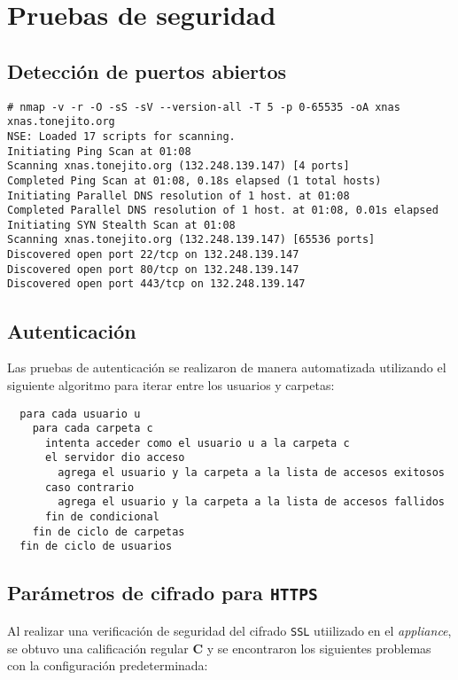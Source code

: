     \section {Pruebas de seguridad}

      \subsection {Detecci\'{o}n de puertos abiertos}

{
\scriptsize
\linespread{1}
\begin{verbatim}
# nmap -v -r -O -sS -sV --version-all -T 5 -p 0-65535 -oA xnas xnas.tonejito.org
NSE: Loaded 17 scripts for scanning.
Initiating Ping Scan at 01:08
Scanning xnas.tonejito.org (132.248.139.147) [4 ports]
Completed Ping Scan at 01:08, 0.18s elapsed (1 total hosts)
Initiating Parallel DNS resolution of 1 host. at 01:08
Completed Parallel DNS resolution of 1 host. at 01:08, 0.01s elapsed
Initiating SYN Stealth Scan at 01:08
Scanning xnas.tonejito.org (132.248.139.147) [65536 ports]
Discovered open port 22/tcp on 132.248.139.147
Discovered open port 80/tcp on 132.248.139.147
Discovered open port 443/tcp on 132.248.139.147
\end{verbatim}
}


      \subsection {Autenticaci\'{o}n}

Las pruebas de autenticaci\'{o}n se realizaron de manera automatizada utilizando el siguiente algoritmo para iterar entre los usuarios y carpetas:

{
\scriptsize
\linespread{1}
\begin{verbatim}
  para cada usuario u
    para cada carpeta c
      intenta acceder como el usuario u a la carpeta c
      el servidor dio acceso
        agrega el usuario y la carpeta a la lista de accesos exitosos
      caso contrario
        agrega el usuario y la carpeta a la lista de accesos fallidos
      fin de condicional
    fin de ciclo de carpetas
  fin de ciclo de usuarios
\end{verbatim}
}

      \subsection {Par\'{a}metros de cifrado para \texttt{HTTPS}}

Al realizar una verificaci\'{o}n de seguridad del cifrado \texttt{SSL} utiilizado en el \textsl{appliance}, se obtuvo una calificaci\'{o}n regular \textbf{C} y se encontraron los siguientes problemas con la configuraci\'{o}n predeterminada:

